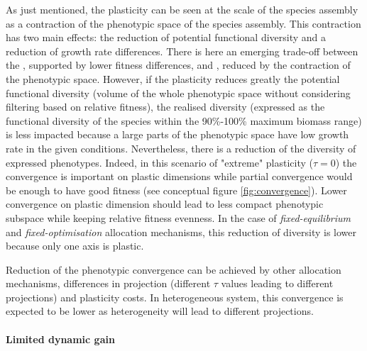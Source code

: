 As just mentioned, the plasticity can be seen at the scale of the species assembly  as a contraction of the phenotypic space of the species assembly. This contraction has two main effects: the reduction of potential functional diversity and a reduction of growth rate differences. There is here an emerging trade-off between the , supported by lower fitness differences, and , reduced by the contraction of the phenotypic space. However, if the plasticity reduces greatly the potential functional diversity (volume of the whole phenotypic space without considering filtering based on relative fitness), the realised diversity (expressed as the functional diversity of the species within the 90\%-100\% maximum biomass range) is less impacted because a large parts of the phenotypic space have low growth rate in the given conditions. Nevertheless, there is a reduction of the diversity of expressed phenotypes. Indeed, in this scenario of "extreme" plasticity ($\tau = 0$) the convergence is important on plastic dimensions while partial convergence would be enough to have good fitness (see conceptual figure \ref{fig:convergence}). Lower convergence on plastic dimension should lead to less compact phenotypic subspace while keeping relative fitness evenness. In the case of \textit{fixed-equilibrium} and \textit{fixed-optimisation} allocation mechanisms, this reduction of diversity is lower because only one axis is plastic.

Reduction of the phenotypic convergence can be achieved by other allocation mechanisms, differences in projection (different $\tau$ values leading to different projections) and plasticity costs. In heterogeneous system, this convergence is expected to be lower as heterogeneity will lead to different projections.

\paragraph{Limited dynamic gain}

